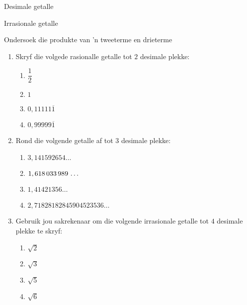 \begin{Aktiwiteit}{Desimale getalle}
\begin{aktiwiteit}{Irrasionale getalle}
\begin{aktiwiteit}{Ondersoek die produkte van 'n tweeterme en drieterme}
\begin{eocexercises}{}
\begin{enumerate}[itemsep=5pt, label=\textbf{\arabic*}. ]
\item Skryf die volgede rasionalle getalle tot $2$ desimale plekke:
    \begin{enumerate}[itemsep=5pt, label=\textbf{\alph*}. ] 
    \item $\dfrac{1}{2}$
    \item $1$
    \item $0,11111\overline{1}$
    \item $0,99999\overline{1}$
    \end{enumerate}

\item Rond die volgende getalle af tot $3$ desimale plekke:
\begin{multicols}{2}
    \begin{enumerate}[itemsep=5pt, label=\textbf{\alph*}. ] 
    \item $3,141592654\ldots$
    \item $1,618\phantom{\rule{0.166667em}{0ex}}033\phantom{\rule{0.166667em}{0ex}}989\phantom{\rule{0.166667em}{0ex}}\ldots$
    \item $1,41421356\ldots$
    \item $2,71828182845904523536\ldots$
    \end{enumerate}
\end{multicols}
\item Gebruik jou sakrekenaar om die volgende irrasionale getalle tot $4$ desimale plekke te skryf:
\begin{multicols}{2}
    \begin{enumerate}[itemsep=5pt, label=\textbf{\alph*}. ] 
    \item $\sqrt{2}$
    \item $\sqrt{3}$
    \item $\sqrt{5}$
    \item $\sqrt{6}$
    \end{enumerate}
\end{multicols}


\end{enumerate}
\end{eocexercises}
\end{aktiwiteit}
\end{aktiwiteit}
\end{Aktiwiteit}
